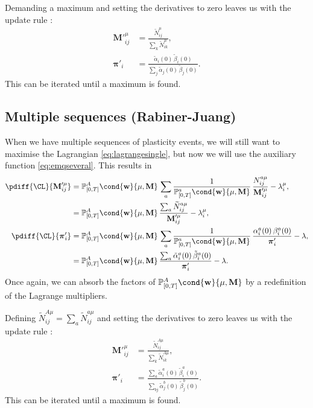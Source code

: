 \documentclass[12pt]{article}
\newcommand{\pib}{\boldsymbol{\pi}}
\newcommand{\w}{\mathbf{w}}
\newcommand{\M}{\mathbf{M}}
\newcommand{\pr}{\mathbb{P}}
\begin{document}
Demanding a maximum and setting the derivatives to zero leaves us with the update rule \cite{Baum1970baumwelch}:
%
\begin{equation}\label{eq:BWupdate}
\begin{aligned}
  \M'^\mu_{ij} &= \frac{ \widetilde{N}^\mu_{ij} }{ \sum_k \widetilde{N}^\mu_{ik} },\\
  \pib'_{i} &= \frac{ \tilde{\alpha}_i(0) \, \tilde{\beta}_i(0) }{ \sum_j \tilde{\alpha}_j(0) \, \tilde{\beta}_j(0) }.
\end{aligned}
\end{equation}
%
This can be iterated until a maximum is found.


\subsection{Multiple sequences (Rabiner-Juang) \label{sec:rj}}

When we have multiple sequences of plasticity events, we will still want to maximise the Lagrangian \eqref{eq:lagrangesingle}, but now we will use the auxiliary function \eqref{eq:emqseveral}.
This results in
%
\begin{equation}\label{eq:multidiffs}
\begin{aligned}
  \pdiff{\CL}{\M'^\mu_{ij}} &= \pr^A_{[0,T]}\cond{\w}{\mu,\M} \,\sum_a \frac{1}{\pr^a_{[0,T]}\cond{\w}{\mu,\M}} \,
    \frac{ N^{a\mu}_{ij} }{ \M'^\mu_{ij} } - \lambda^\mu_{i}, \\
    &= \pr^A_{[0,T]}\cond{\w}{\mu,\M} \, \frac{ \sum_a \widetilde{N}^{a\mu}_{ij} }{ \M'^\mu_{ij} } - \lambda^\mu_{i}, \\
  \pdiff{\CL}{\pib'_{i}} &= \pr^A_{[0,T]}\cond{\w}{\mu,\M} \,\sum_a \frac{1}{\pr^a_{[0,T]}\cond{\w}{\mu,\M}} \,
    \frac{ \alpha^a_i(0) \, \beta^a_i(0) }{ \pib'_{i} } - \lambda,\\
    &= \pr^A_{[0,T]}\cond{\w}{\mu,\M} \,
    \frac{ \sum_a \tilde{\alpha}^a_i(0) \, \tilde{\beta}^a_i(0) }{ \pib'_{i} } - \lambda.
\end{aligned}
\end{equation}
%
Once again, we can absorb the factors of $\pr^A_{[0,T]}\cond{\w}{\mu,\M}$ by a redefinition of the Lagrange multipliers.

Defining $\widetilde{N}^{A\mu}_{ij} = \sum_a \widetilde{N}^{a\mu}_{ij}$ and setting the derivatives to zero leaves us with the update rule \cite{rabiner1993speechrec}:
%
\begin{equation}\label{eq:RJupdate}
\begin{aligned}
  \M'^\mu_{ij} &= \frac{ \widetilde{N}^{A\mu}_{ij} }{ \sum_k \widetilde{N}^{A\mu}_{ik} },\\
  \pib'_{i} &= \frac{ \sum_a \tilde{\alpha}^a_i(0) \, \tilde{\beta}^a_i(0) }{ \sum_{bj} \tilde{\alpha}^b_j(0) \, \tilde{\beta}^b_j(0) }.
\end{aligned}
\end{equation}
%
This can be iterated until a maximum is found.
\end{document}
